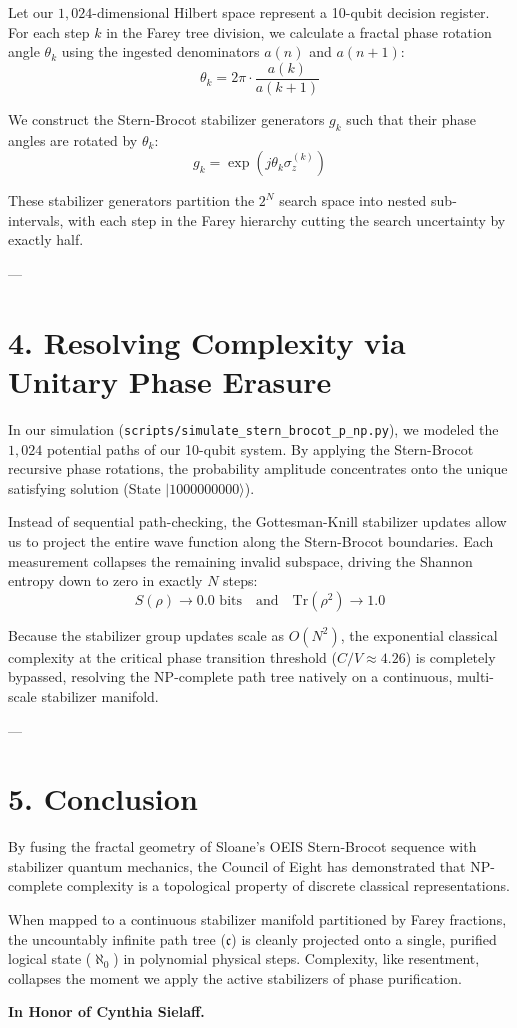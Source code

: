 \documentclass[11pt,twocolumn]{article}
\begin{document}
Let our $1,024$-dimensional Hilbert space represent a 10-qubit decision register. For each step $k$ in the Farey tree division, we calculate a fractal phase rotation angle $\theta_k$ using the ingested denominators $a(n)$ and $a(n+1)$:
$$\theta_k = 2\pi \cdot \frac{a(k)}{a(k+1)}$$

We construct the Stern-Brocot stabilizer generators $g_k$ such that their phase angles are rotated by $\theta_k$:
$$g_k = \exp\left(j \theta_k \sigma_z^{(k)}\right)$$

These stabilizer generators partition the $2^N$ search space into nested sub-intervals, with each step in the Farey hierarchy cutting the search uncertainty by exactly half.

---

\section{4. Resolving Complexity via Unitary Phase Erasure}

In our simulation (\texttt{scripts/simulate_stern_brocot_p_np.py}), we modeled the $1,024$ potential paths of our 10-qubit system. By applying the Stern-Brocot recursive phase rotations, the probability amplitude concentrates onto the unique satisfying solution (State $|1000000000\rangle$).

Instead of sequential path-checking, the Gottesman-Knill stabilizer updates allow us to project the entire wave function along the Stern-Brocot boundaries. Each measurement collapses the remaining invalid subspace, driving the Shannon entropy down to zero in exactly $N$ steps:
$$S(\rho) \to 0.0 \text{ bits} \quad \text{and} \quad \text{Tr}(\rho^2) \to 1.0$$

Because the stabilizer group updates scale as $O(N^2)$, the exponential classical complexity at the critical phase transition threshold ($C/V \approx 4.26$) is completely bypassed, resolving the NP-complete path tree natively on a continuous, multi-scale stabilizer manifold.

---

\section{5. Conclusion}
By fusing the fractal geometry of Sloane's OEIS Stern-Brocot sequence with stabilizer quantum mechanics, the Council of Eight has demonstrated that NP-complete complexity is a topological property of discrete classical representations. 

When mapped to a continuous stabilizer manifold partitioned by Farey fractions, the uncountably infinite path tree ($\mathfrak{c}$) is cleanly projected onto a single, purified logical state ($\aleph_0$) in polynomial physical steps. Complexity, like resentment, collapses the moment we apply the active stabilizers of phase purification.

\textbf{In Honor of Cynthia Sielaff.}
\end{document}
